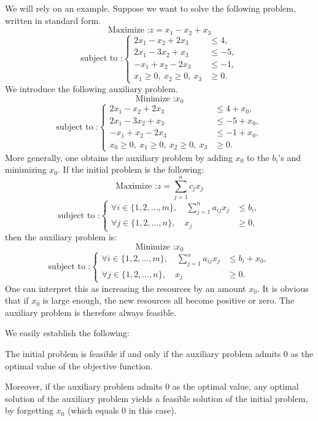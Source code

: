 We will rely on an example. Suppose we want to solve the following problem, written in standard form.
\[
    \text{Maximize :} z = x_1 - x_2 + x_3
\]
\[
    \text{subject to :}
    \left\{
    \begin{aligned}
        2x_1 - x_2 + 2x_3 &\le 4,\\
        2x_1 - 3x_2 + x_3 &\le -5,\\
        -x_1 + x_2 - 2x_3 &\le -1,\\
        x_1 \ge 0,\ x_2 \ge 0,\ x_3 &\ge 0.
    \end{aligned}
    \right.
\]
We introduce the following auxiliary problem.
\[
    \text{Minimize :} x_0
\]
\[
    \text{subject to :}
    \left\{
    \begin{aligned}
        2x_1 - x_2 + 2x_3 &\le 4 + x_0,\\
        2x_1 - 3x_2 + x_3 &\le -5 + x_0,\\
        -x_1 + x_2 - 2x_3 &\le -1 + x_0,\\
        x_0 \ge 0,\ x_1 \ge 0,\ x_2 \ge 0,\ x_3 &\ge 0.
    \end{aligned}
    \right.
\]
More generally, one obtains the auxiliary problem by adding \(x_0\) to the \(b_i\)'s and minimizing \(x_0\). If the initial problem is the following:
\[
    \text{Maximize :} z=\sum_{j=1}^n c_j x_j
\]
\[
    \text{subject to :}
    \left\{
    \begin{aligned}
        \forall i\in\{1,2,\dots,m\},\quad \sum_{j=1}^n a_{ij}x_j &\le b_i,\\
        \forall j\in\{1,2,\dots,n\},\quad x_j &\ge 0,
    \end{aligned}
    \right.
\]
then the auxiliary problem is:
\[
    \text{Minimize :} x_0
\]
\[
    \text{subject to :}
    \left\{
    \begin{aligned}
        \forall i\in\{1,2,\dots,m\},\quad \sum_{j=1}^n a_{ij}x_j &\le b_i + x_0,\\
        \forall j\in\{1,2,\dots,n\},\quad x_j &\ge 0.
    \end{aligned}
    \right.
\]
One can interpret this as increasing the resources by an amount \(x_0\). It is obvious that if \(x_0\) is large enough, the new resources all become positive or zero. The auxiliary problem is therefore always feasible.

We easily establish the following:

\begin{proposition}
    The initial problem is feasible if and only if the auxiliary problem admits \(0\) as the optimal value of the objective function.

    Moreover, if the auxiliary problem admits \(0\) as the optimal value, any optimal solution of the auxiliary problem yields a feasible solution of the initial problem, by \og forgetting \fg \(x_0\) (which equals \(0\) in this case).
\end{proposition}

